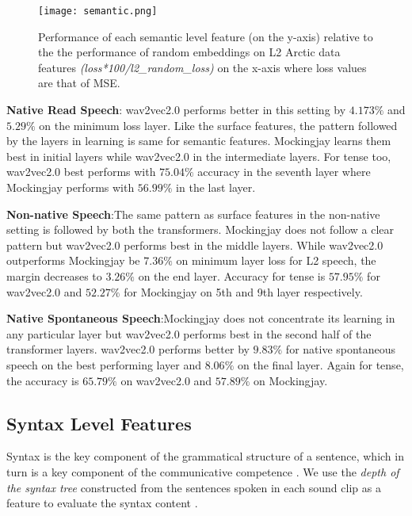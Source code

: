 \documentclass[sigconf]{acmart}
\newcommand{\wv}{wav2vec2.0\xspace}
\newcommand{\mj}{Mockingjay\xspace}
\begin{document}
\begin{figure*}
  \texttt{[image: semantic.png]}
  \caption{\label{Vocabulary}Performance of each semantic level feature (on the y-axis) relative to the the performance of random embeddings on L2 Arctic data features \emph{(loss*100/l2\_random\_loss)} on the x-axis where loss values are that of MSE.}
\end{figure*}

\textbf{Native Read Speech}:
wav2vec2.0 performs better in this setting by $4.173\%$ and $5.29\%$ on the minimum loss layer. Like the surface features, the pattern followed by the layers in learning is same for semantic features. Mockingjay learns them best in initial layers while wav2vec2.0 in the intermediate layers. For tense too, {\wv} best performs with $75.04\%$ accuracy in the seventh layer where {\mj} performs with $56.99\%$ in the last layer.

\textbf{Non-native Speech}:The same pattern as surface features in the non-native setting is followed by both the transformers. {\mj} does not follow a clear pattern but {\wv} performs best in the middle layers. While wav2vec2.0 outperforms Mockingjay be $7.36\%$ on minimum layer loss for L2 speech, the margin decreases to $3.26\%$ on the end layer. Accuracy for tense is $57.95\%$ for {\wv} and $52.27\%$ for {\mj} on 5th and 9th layer respectively.

\textbf{Native Spontaneous Speech}:{\mj} does not concentrate its learning in any particular layer but {\wv} performs best in the second half of the transformer layers. {\wv} performs better by $9.83\%$ for native spontaneous speech on the best performing layer and $8.06\%$ on the final layer. Again for tense, the accuracy is $65.79\%$ on {\wv} and $57.89\%$ on {\mj}.
\subsection{Syntax Level Features}
\label{sec:syntax level features}

Syntax is the key component of the grammatical structure of a sentence, which in turn is a key component of the communicative competence \cite{canale1980theoretical}. We use the \emph{depth of the syntax tree} constructed from the sentences spoken in each sound clip as a feature to evaluate the syntax content \cite{conneau2018you,jawahar-etal-2019-bert,kumar2019get}.
\end{document}
